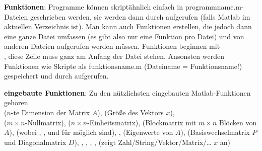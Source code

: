 \textbf{Funktionen}:
Programme können skriptähnlich einfach in programmname.m-Dateien geschrieben
werden, sie werden dann durch  aufgerufen (falls Matlab im
aktuellen Verzeichnis ist).
Man kann auch Funktionen erstellen, die jedoch dann eine ganze Datei umfassen
(es gibt also nur eine Funktion pro Datei) und von anderen Dateien aufgerufen
werden müssen.
Funktionen beginnen mit  \\
, diese Zeile muss ganz am Anfang
der Datei stehen.
Ansonsten werden Funktionen wie Skripte als funktionsname.m
(Dateiname = Funktionsname!) gespeichert und durch
 aufgerufen.

\textbf{eingebaute Funktionen}:
Zu den nützlichsten eingebauten Matlab-Funktionen gehören \\
 ($n$-te Dimension der Matrix $A$),
 (Größe des Vektors $x$), \\
 ($m \times n$-Nullmatrix),
 ($n \times n$-Einheitsmatrix),
 (Blockmatrix mit $m \times n$ Blöcken von $A$),
 (wobei , ,  und 
für  möglich sind),
,
 (Eigenwerte von $A$),
 (Basiswechselmatrix $P$ und Diagonalmatrix $D$),
,
, ,
,
 (zeigt Zahl/String/Vektor/Matrix/\ldots{} $x$ an)

\pagebreak

